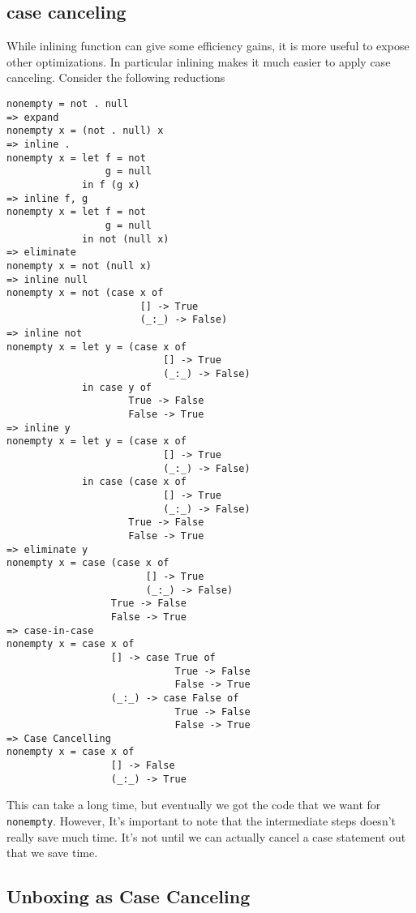 \documentclass{article}
\begin{document}
\subsection*{case canceling}
While inlining function can give some efficiency gains, it is more useful to expose other optimizations.
In particular inlining makes it much easier to apply case canceling.
Consider the following reductions

\begin{verbatim}
nonempty = not . null
=> expand
nonempty x = (not . null) x
=> inline .
nonempty x = let f = not 
                 g = null
             in f (g x)
=> inline f, g
nonempty x = let f = not 
                 g = null
             in not (null x)
=> eliminate
nonempty x = not (null x)
=> inline null
nonempty x = not (case x of
                       [] -> True
                       (_:_) -> False)
=> inline not
nonempty x = let y = (case x of
                           [] -> True
                           (_:_) -> False)
             in case y of
                     True -> False
                     False -> True
=> inline y
nonempty x = let y = (case x of
                           [] -> True
                           (_:_) -> False)
             in case (case x of
                           [] -> True
                           (_:_) -> False)
                     True -> False
                     False -> True
=> eliminate y
nonempty x = case (case x of
                        [] -> True
                        (_:_) -> False)
                  True -> False
                  False -> True
=> case-in-case
nonempty x = case x of
                  [] -> case True of
                             True -> False
                             False -> True
                  (_:_) -> case False of
                             True -> False
                             False -> True
=> Case Cancelling
nonempty x = case x of
                  [] -> False
                  (_:_) -> True
\end{verbatim}

This can take a long time, but eventually we got the code that we want for \texttt{nonempty}.
However, It's important to note that the intermediate steps doesn't really save much time.
It's not until we can actually cancel a case statement out that we save time.

\subsection*{Unboxing as Case Canceling}
\end{document}
